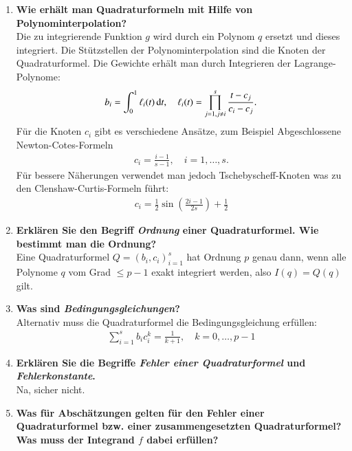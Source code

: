 \begin{enumerate}
		\item \textbf{Wie erhält man Quadraturformeln mit Hilfe von Polynominterpolation?} \\
			Die zu integrierende Funktion \(g\) wird durch ein Polynom \(q\) ersetzt und dieses integriert. Die Stützstellen der Polynominterpolation sind die Knoten der Quadraturformel. Die Gewichte erhält man durch Integrieren der Lagrange-Polynome:
			\begin{align*}
				b_i=\int_{0}^{1}\ell_i(t)\dif{t},\quad \ell_i(t)=\prod_{j=1,j\neq i}^{s}\frac{t-c_j}{c_i-c_j}.
			\end{align*}
			Für die Knoten \(c_i\) gibt es verschiedene Ansätze, zum Beispiel Abgeschlossene Newton-Cotes-Formeln
			\begin{align*}
				c_i=\frac{i-1}{s-1}, \quad i=1,\dots,s.
			\end{align*}
			Für bessere Näherungen verwendet man jedoch Tschebyscheff-Knoten was zu den Clenshaw-Curtis-Formeln führt:
			\begin{align*}
				c_i=\frac{1}{2}\sin\left(\frac{2i-1}{2s}\right)+\frac{1}{2}
			\end{align*}
			
		\item \textbf{Erklären Sie den Begriff \textit{Ordnung} einer Quadraturformel. Wie bestimmt man die Ordnung?} \\
			Eine Quadraturformel \(Q=(b_i,c_i)^s_{i=1}\) hat Ordnung \(p\) genau dann, wenn alle Polynome \(q\) vom Grad \(\leq p-1\) exakt integriert werden, also \(I(q)=Q(q)\) gilt. \\
			
		
		\item \textbf{Was sind \textit{Bedingungsgleichungen}?} \\
			Alternativ muss die Quadraturformel die Bedingungsgleichung erfüllen:
				\begin{align*}
					\sum_{i=1}^{s}b_ic_i^k=\frac{1}{k+1},\quad
						k=0,\dots,p-1
				\end{align*}
		
		\item \textbf{Erklären Sie die Begriffe \textit{Fehler einer Quadraturformel} und \textit{Fehlerkonstante}.} \\
		Na, sicher nicht.
		
		\item \textbf{Was für Abschätzungen gelten für den Fehler einer Quadraturformel bzw. einer zusammengesetzten Quadraturformel? Was muss der Integrand $f$ dabei erfüllen?} \\
		

\end{enumerate}
